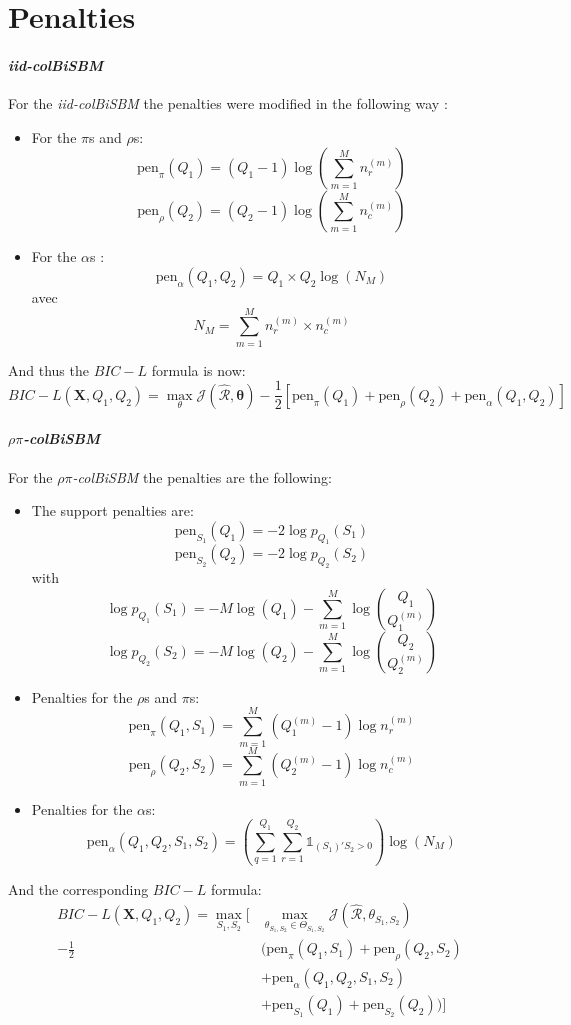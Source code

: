 \documentclass[12pt,a4paper]{report}
\begin{document}
\section{Penalties}

\paragraph*{\textit{iid-colBiSBM}}
For the \textit{iid-colBiSBM} the penalties were modified in the following way :

\begin{itemize}
    \item For the $\pi$s and $\rho$s:
    \[\text{pen}_{\pi}(Q_1) = (Q_1 - 1)\log(\sum_{m=1}^{M}n_{r}^{(m)})\]
    \[\text{pen}_{\rho}(Q_2) = (Q_2 - 1)\log(\sum_{m=1}^{M}n_{c}^{(m)})\]
    \item For the $\alpha$s :
    \[\text{pen}_{\alpha}(Q_1, Q_2) = Q_1 \times Q_2 \log(N_M)\]
    avec
    \[ N_M = \sum_{m = 1}^{M} n_{r}^{(m)} \times n_{c}^{(m)} \]
\end{itemize}
And thus the $BIC-L$ formula is now:
\[ \text{$BIC-L$}(\bm{X},Q_1, Q_2) = \max_{\theta} \mathcal{J} (\mathcal{\hat{R}}, \bm{\theta}) 
- \frac{1}{2} [\text{pen}_{\pi}(Q_1) + \text{pen}_{\rho}(Q_2) + \text{pen}_{\alpha}(Q_1, Q_2)]\]

\paragraph*{\textit{$\rho\pi$-colBiSBM}}
For the \textit{$\rho\pi$-colBiSBM} the penalties are the following:

\begin{itemize}
    \item The support penalties are:
    \[ \text{pen}_{S_1}(Q_1) = -2 \log p_{Q_1} (S_1) \]
    \[ \text{pen}_{S_2}(Q_2) = -2 \log p_{Q_2} (S_2) \]
    with
    \[ \log p_{Q_1}(S_1) = - M \log(Q_1) - \sum_{m=1}^{M} \log {Q_1 \choose Q_1^{(m)}} \]
    \[ \log p_{Q_2}(S_2) = - M \log(Q_2) - \sum_{m=1}^{M} \log {Q_2 \choose Q_2^{(m)}} \]
    \item Penalties for the $\rho$s and $\pi$s:
    \[ \text{pen}_{\pi}(Q_1, S_1) = \sum_{m=1}^{M} (Q_{1}^{(m)} - 1) \log n_{r}^{(m)} \]
    \[ \text{pen}_{\rho}(Q_2, S_2) = \sum_{m=1}^{M} (Q_{2}^{(m)} - 1) \log n_{c}^{(m)} \]
    \item Penalties for the $\alpha$s:
    \[ \text{pen}_{\alpha}(Q_1, Q_2, S_1, S_2) = (\sum_{q=1}^{Q_1} \sum_{r=1}^{Q_2} \mathbb{1}_{(S_1)'S_2 > 0}) \log (N_M) \]
\end{itemize}
And the corresponding $BIC-L$ formula:
\[
    \begin{aligned}
        \text{$BIC-L$}(\bm{X},Q_1, Q_2) = 
        \max_{S_1,S_2} [
            & \max_{\theta_{S_1,S_2} \in \Theta_{S_1,S_2}} \mathcal{J}(\mathcal{\hat{R}},\theta_{S_1,S_2})\\
            - \frac{1}{2} & (\text{pen}_{\pi}(Q_1, S_1)  + \text{pen}_{\rho}(Q_2, S_2)\\
            &+ \text{pen}_{\alpha}(Q_1, Q_2, S_1, S_2)\\
            &+ \text{pen}_{S_1}(Q_1) + \text{pen}_{S_2}(Q_2))]\\
    \end{aligned}
\]
\end{document}
